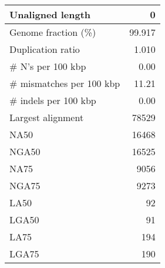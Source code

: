 \documentclass[12pt,a4paper]{article}
\begin{document}
\begin{table}[ht]
\begin{center}
\begin{tabular}{|l*{1}{|r}|}
Unaligned length & 0 \\ \hline
Genome fraction (\%) & 99.917 \\ \hline
Duplication ratio & 1.010 \\ \hline
\# N's per 100 kbp & 0.00 \\ \hline
\# mismatches per 100 kbp & 11.21 \\ \hline
\# indels per 100 kbp & 0.00 \\ \hline
Largest alignment & 78529 \\ \hline
NA50 & 16468 \\ \hline
NGA50 & 16525 \\ \hline
NA75 & 9056 \\ \hline
NGA75 & 9273 \\ \hline
LA50 & 92 \\ \hline
LGA50 & 91 \\ \hline
LA75 & 194 \\ \hline
LGA75 & 190 \\ \hline
\end{tabular}
\end{center}
\end{table}
\end{document}

